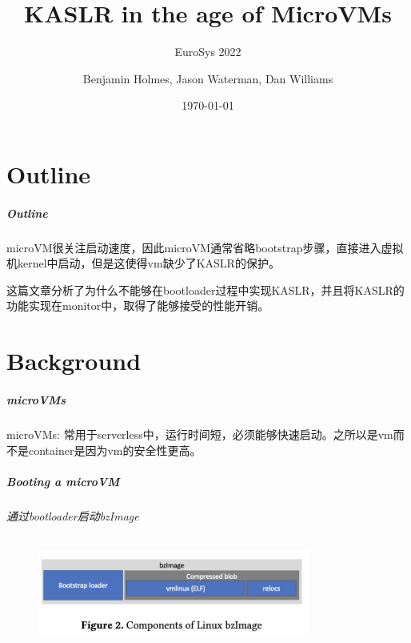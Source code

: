 \documentclass[
    aspectratio=169,  %
]{ctexbeamer}
\title{KASLR in the age of MicroVMs}
\subtitle{EuroSys 2022}       %
\author{Benjamin Holmes, Jason Waterman, Dan Williams}%
\date{\today}                        %
\begin{document}
\maketitle                           %

\part{Outline}

\begin{frame}
  \frametitle{Outline}

microVM很关注启动速度，因此microVM通常省略bootstrap步骤，直接进入虚拟机kernel中启动，但是这使得vm缺少了KASLR的保护。

\vspace{0.15\textheight}

这篇文章分析了为什么不能够在bootloader过程中实现KASLR，并且将KASLR的功能实现在monitor中，取得了能够接受的性能开销。

\end{frame}

\part{Background}

\begin{frame}
  \frametitle{microVMs}
  microVMs: 常用于serverless中，运行时间短，必须能够快速启动。之所以是vm而不是container是因为vm的安全性更高。
\end{frame}

\begin{frame}
  \frametitle{Booting a microVM}
  \framesubtitle{通过bootloader启动bzImage}

  \begin{figure}
  	\centering
  	\includegraphics[width=0.8\textwidth]{img/bzImage.png}
  \end{figure}

%
\end{frame}
\end{document}
